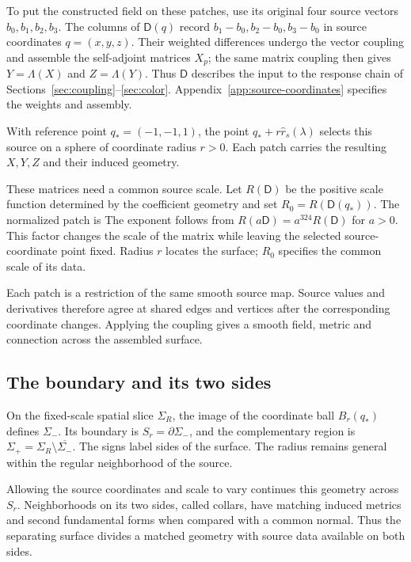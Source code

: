 To put the constructed field on these patches, use its original four source vectors $b_0,b_1,b_2,b_3$. The columns of $\mathsf D(q)$ record $b_1-b_0,b_2-b_0,b_3-b_0$ in source coordinates $q=(x,y,z)$. Their weighted differences undergo the vector coupling and assemble the self-adjoint matrices $X_p$; the same matrix coupling then gives $Y=\Lambda(X)$ and $Z=\Lambda(Y)$. Thus $\mathsf D$ describes the input to the response chain of Sections~\ref{sec:coupling}--\ref{sec:color}. Appendix~\ref{app:source-coordinates} specifies the weights and assembly.

With reference point $q_*=(-1,-1,1)$, the point $q_*+r\widehat r_s(\lambda)$ selects this source on a sphere of coordinate radius $r>0$. Each patch carries the resulting $X,Y,Z$ and their induced geometry.

These matrices need a common source scale. Let $R(\mathsf D)$ be the positive scale function determined by the coefficient geometry and set $R_0=R(\mathsf D(q_*))$. The normalized patch is
\ClosedSourcePatchDisplay
The exponent follows from $R(a\mathsf D)=a^{324}R(\mathsf D)$ for $a>0$. This factor changes the scale of the matrix while leaving the selected source-coordinate point fixed. Radius $r$ locates the surface; $R_0$ specifies the common scale of its data.

Each patch is a restriction of the same smooth source map. Source values and derivatives therefore agree at shared edges and vertices after the corresponding coordinate changes. Applying the coupling gives a smooth field, metric and connection across the assembled surface.

\subsection{The boundary and its two sides}
On the fixed-scale spatial slice $\Sigma_R$, the image of the coordinate ball $B_r(q_*)$ defines $\Sigma_-$. Its boundary is $S_r=\partial\Sigma_-$, and the complementary region is $\Sigma_+=\Sigma_R\setminus\overline{\Sigma_-}$. The signs label sides of the surface. The radius remains general within the regular neighborhood of the source.

Allowing the source coordinates and scale to vary continues this geometry across $S_r$. Neighborhoods on its two sides, called collars, have matching induced metrics and second fundamental forms when compared with a common normal. Thus the separating surface divides a matched geometry with source data available on both sides.

\FloatBarrier
